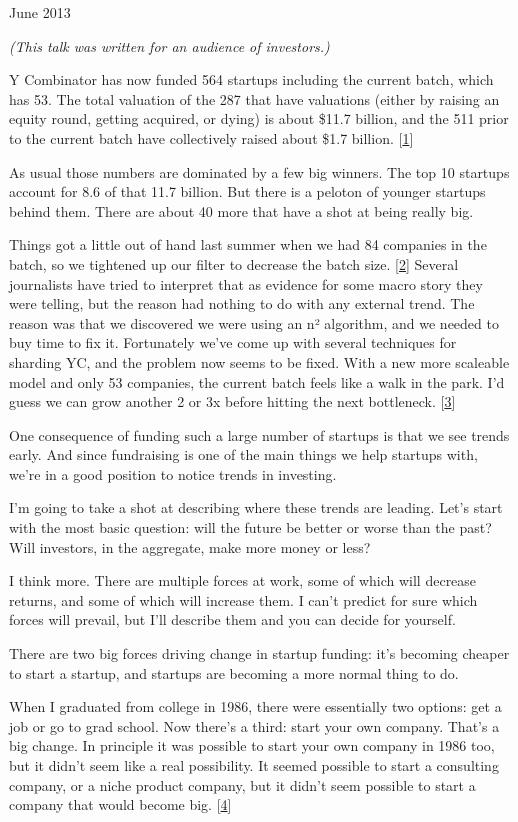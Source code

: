 June 2013

\emph{(This talk was written for an audience of investors.)}

Y Combinator has now funded 564 startups including the current batch,
which has 53. The total valuation of the 287 that have valuations
(either by raising an equity round, getting acquired, or dying) is about
\$11.7 billion, and the 511 prior to the current batch have collectively
raised about \$1.7 billion. {[}\hyperref[f1n]{1}{]}

As usual those numbers are dominated by a few big winners. The top 10
startups account for 8.6 of that 11.7 billion. But there is a peloton of
younger startups behind them. There are about 40 more that have a shot
at being really big.

Things got a little out of hand last summer when we had 84 companies in
the batch, so we tightened up our filter to decrease the batch size.
{[}\hyperref[f2n]{2}{]} Several journalists have tried to interpret that
as evidence for some macro story they were telling, but the reason had
nothing to do with any external trend. The reason was that we discovered
we were using an n² algorithm, and we needed to buy time to fix it.
Fortunately we've come up with several techniques for sharding YC, and
the problem now seems to be fixed. With a new more scaleable model and
only 53 companies, the current batch feels like a walk in the park. I'd
guess we can grow another 2 or 3x before hitting the next bottleneck.
{[}\hyperref[f3n]{3}{]}

One consequence of funding such a large number of startups is that we
see trends early. And since fundraising is one of the main things we
help startups with, we're in a good position to notice trends in
investing.

I'm going to take a shot at describing where these trends are leading.
Let's start with the most basic question: will the future be better or
worse than the past? Will investors, in the aggregate, make more money
or less?

I think more. There are multiple forces at work, some of which will
decrease returns, and some of which will increase them. I can't predict
for sure which forces will prevail, but I'll describe them and you can
decide for yourself.

There are two big forces driving change in startup funding: it's
becoming cheaper to start a startup, and startups are becoming a more
normal thing to do.

When I graduated from college in 1986, there were essentially two
options: get a job or go to grad school. Now there's a third: start your
own company. That's a big change. In principle it was possible to start
your own company in 1986 too, but it didn't seem like a real
possibility. It seemed possible to start a consulting company, or a
niche product company, but it didn't seem possible to start a company
that would become big. {[}\hyperref[f4n]{4}{]}

